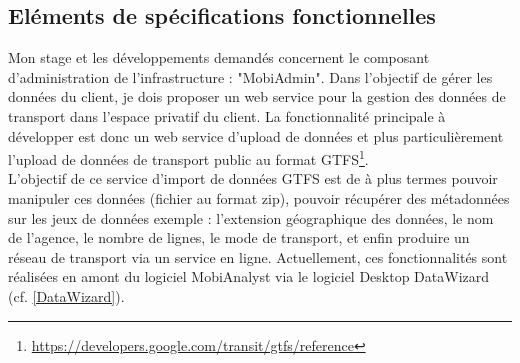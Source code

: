 \subsection{Eléments de spécifications fonctionnelles}

Mon stage et les développements demandés concernent le composant d'administration de l'infrastructure : "MobiAdmin". Dans l'objectif de gérer les données du client, je dois proposer un web service pour la gestion des données de transport dans l'espace privatif du client.
La fonctionnalité principale à développer est donc un web service d'upload de données et plus particulièrement l'upload de données de transport public au format GTFS\footnote{\url{https://developers.google.com/transit/gtfs/reference}}.\\ 

L'objectif de ce service d'import de données GTFS est de à plus termes pouvoir manipuler ces données (fichier au format zip), pouvoir récupérer des métadonnées sur les jeux de données exemple : l'extension géographique des données, le nom de l'agence, le nombre de lignes, le mode de transport, et enfin produire un réseau de transport via un service en ligne. Actuellement, ces fonctionnalités sont réalisées en amont du logiciel MobiAnalyst via le logiciel Desktop DataWizard (cf. \ref{DataWizard}).\\

